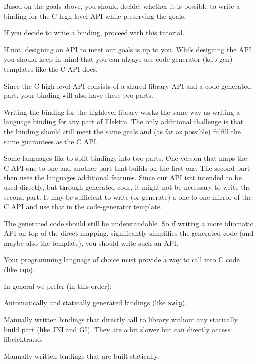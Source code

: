 Based on the goals above, you should decide, whether it is possible to write a binding for the C high-\/level A\+PI while preserving the goals.

If you decide to write a binding, proceed with this tutorial.

If not, designing an A\+PI to meet our goals is up to you. While designing the A\+PI you should keep in mind that you can always use code-\/generator ({\ttfamily kdb gen}) templates like the C A\+PI does.

Since the C high-\/level A\+PI consists of a shared library A\+PI and a code-\/generated part, your binding will also have these two parts.

Writing the binding for the {\ttfamily highlevel} library works the same way as writing a language binding for any part of Elektra. The only additional challenge is that the binding should still meet the same goals and (as far as possible) fulfill the same guarantees as the C A\+PI.

Some languages like to split bindings into two parts. One version that maps the C A\+PI one-\/to-\/one and another part that builds on the first one. The second part then uses the languages additional features. Since our A\+PI isn\textquotesingle{}t intended to be used directly, but through generated code, it might not be necessary to write the second part. It may be sufficient to write (or generate) a one-\/to-\/one mirror of the C A\+PI and use that in the code-\/generator template.

The generated code should still be understandable. So if writing a more idiomatic A\+PI on top of the direct mapping, significantly simplifies the generated code (and maybe also the template), you should write such an A\+PI.

Your programming language of choice must provide a way to call into C code (like \href{https://golang.org/cmd/cgo/}{\tt cgo}).

In general we prefer (in this order)\+:


\begin{DoxyEnumerate}
\item Automatically and statically generated bindings (like \href{http://www.swig.org/}{\tt swig}).
\item Manually written bindings that directly call to library without any statically build part (like J\+NI and GI). They are a bit slower but can directly access libelektra.\+so.
\item Manually written bindings that are built statically.
\end{DoxyEnumerate}

